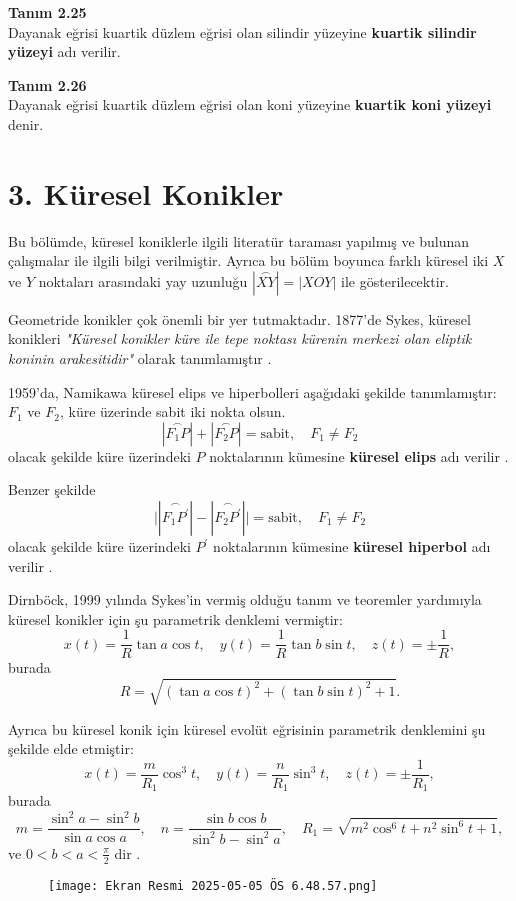\documentclass[a4paper,12pt]{article}
\begin{document}
\textbf{Tanım 2.25} \\
Dayanak eğrisi kuartik düzlem eğrisi olan silindir yüzeyine \textbf{kuartik silindir yüzeyi} adı verilir.

\textbf{Tanım 2.26} \\
Dayanak eğrisi kuartik düzlem eğrisi olan koni yüzeyine \textbf{kuartik koni yüzeyi} denir.
\section*{3. Küresel Konikler}

Bu bölümde, küresel koniklerle ilgili literatür taraması yapılmış ve bulunan çalışmalar ile ilgili bilgi verilmiştir. Ayrıca bu bölüm boyunca farklı küresel iki $X$ ve $Y$ noktaları arasındaki yay uzunluğu $|\overset{\frown}{XY}| = |XOY|$ ile gösterilecektir.

Geometride konikler çok önemli bir yer tutmaktadır. 1877’de Sykes, küresel konikleri 
\textit{"Küresel konikler küre ile tepe noktası kürenin merkezi olan eliptik koninin arakesitidir"} 
olarak tanımlamıştır   .

1959’da, Namikawa küresel elips ve hiperbolleri aşağıdaki şekilde tanımlamıştır: $F_1$ ve $F_2$, küre üzerinde sabit iki nokta olsun.
\[
|\overset{\frown}{F_1P}| + |\overset{\frown}{F_2P}| = \text{sabit}, \quad F_1 \neq F_2
\tag{3.1}
\]
olacak şekilde küre üzerindeki $P$ noktalarının kümesine \textbf{küresel elips} adı verilir   .

Benzer şekilde
\[
\big||\overset{\frown}{F_1P^\prime}| - |\overset{\frown}{F_2P^\prime}|\big| = \text{sabit}, \quad F_1 \neq F_2
\tag{3.2}
\]
olacak şekilde küre üzerindeki $P^\prime$ noktalarının kümesine \textbf{küresel hiperbol} adı verilir   .

Dirnböck, 1999 yılında Sykes’in vermiş olduğu tanım ve teoremler yardımıyla küresel konikler için şu parametrik denklemi vermiştir:
\[
x(t) = \frac{1}{R} \tan a \cos t, \quad
y(t) = \frac{1}{R} \tan b \sin t, \quad
z(t) = \pm \frac{1}{R},
\]
burada
\[
R = \sqrt{(\tan a \cos t)^2 + (\tan b \sin t)^2 + 1}.
\]

Ayrıca bu küresel konik için küresel evolüt eğrisinin parametrik denklemini şu şekilde elde etmiştir:
\[
x(t) = \frac{m}{R_1} \cos^3 t, \quad
y(t) = \frac{n}{R_1} \sin^3 t, \quad
z(t) = \pm \frac{1}{R_1},
\]
burada
\[
m = \frac{\sin^2 a - \sin^2 b}{\sin a \cos a}, \quad
n = \frac{\sin b \cos b}{\sin^2 b - \sin^2 a}, \quad
R_1 = \sqrt{m^2 \cos^6 t + n^2 \sin^6 t + 1},
\]
ve $0 < b < a < \frac{\pi}{2}$ dir   .
\begin{figure}
    \centering
    \texttt{[image: Ekran Resmi 2025-05-05 ÖS 6.48.57.png]}
\end{figure}
 
\end{document}
